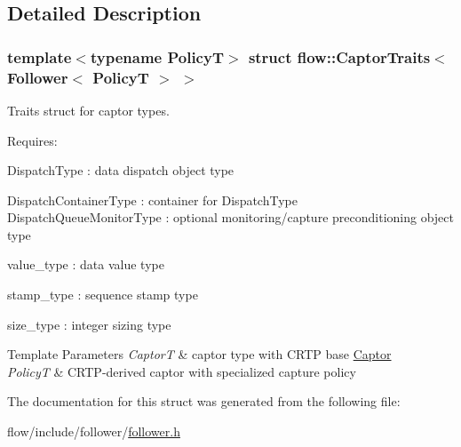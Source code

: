 \subsection{Detailed Description}
\subsubsection*{template$<$typename PolicyT$>$\newline
struct flow\+::\+Captor\+Traits$<$ Follower$<$ Policy\+T $>$ $>$}

Traits struct for captor types. 

Requires\+:
\begin{DoxyItemize}
\item {\ttfamily Dispatch\+Type} \+: data dispatch object type
\item {\ttfamily Dispatch\+Container\+Type} \+: container for {\ttfamily Dispatch\+Type} {\ttfamily Dispatch\+Queue\+Monitor\+Type} \+: optional monitoring/capture preconditioning object type
\item {\ttfamily value\+\_\+type} \+: data value type
\item {\ttfamily stamp\+\_\+type} \+: sequence stamp type
\item {\ttfamily size\+\_\+type} \+: integer sizing type
\end{DoxyItemize}


\begin{DoxyTemplParams}{Template Parameters}
{\em CaptorT} & captor type with C\+R\+TP base {\ttfamily \hyperlink{classflow_1_1_captor}{Captor}} \\
\hline
{\em PolicyT} & C\+R\+T\+P-\/derived captor with specialized capture policy \\
\hline
\end{DoxyTemplParams}


The documentation for this struct was generated from the following file\+:\begin{DoxyCompactItemize}
\item 
flow/include/follower/\hyperlink{follower_8h}{follower.\+h}\end{DoxyCompactItemize}

